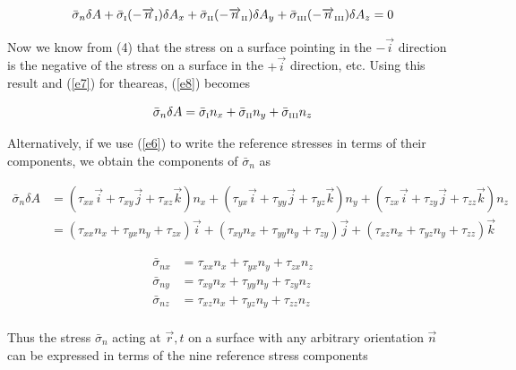 \documentclass{article}
\begin{document}
{\begin{equation}
\bar{\sigma}_{n}\delta A + \bar{\sigma}_{\text{\tiny{I}}}(-\overrightarrow{n}_{\text{\tiny{I}}})\delta A_{x} + \bar{\sigma}_{\text{\tiny{II}}}(-\overrightarrow{n}_{\text{\tiny{II}}})\delta A_{y} + \bar{\sigma}_{\text{\tiny{III}}}(-\overrightarrow{n}_{\text{\tiny{III}}})\delta A_{z} = 0 \label{e8}
\end{equation}

Now we know from (4) that the stress on a surface pointing in the $-\overrightarrow{i}$ direction is the negative of the stress on a surface in the $+\overrightarrow{i}$ direction, etc. Using this result and (\ref{e7}) for theareas, (\ref{e8}) becomes

\begin{equation}
\bar{\sigma}_{n}\delta A = \bar{\sigma}_{\text{\tiny{I}}}n_{x} + \bar{\sigma}_{\text{\tiny{II}}}n_{y} + \bar{\sigma}_{\text{\tiny{III}}}n_{z} \label{e9}
\end{equation}

Alternatively, if we use (\ref{e6}) to write the reference stresses in terms of their components, we obtain the components of $\bar{\sigma}_{n}$ as

\begin{align*}
\bar{\sigma}_{n}\delta A &= (\tau_{xx}\overrightarrow{i} + \tau_{xy}\overrightarrow{j} + \tau_{xz} \overrightarrow{k})n_{x} + (\tau_{yx}\overrightarrow{i} + \tau_{yy}\overrightarrow{j} + \tau_{yz} \overrightarrow{k})n_{y} + (\tau_{zx}\overrightarrow{i} + \tau_{zy}\overrightarrow{j} + \tau_{zz} \overrightarrow{k})n_{z}\\
						 &= (\tau_{xx}n_{x} + \tau_{yx}n_{y} + \tau_{zx})\overrightarrow{i} + (\tau_{xy}n_{x} + \tau_{yy}n_{y} + \tau_{zy})\overrightarrow{j} + (\tau_{xz}n_{x} + \tau_{yz}n_{y} + \tau_{zz})\overrightarrow{k}
\end{align*}

\begin{equation}
\begin{split}
\bar{\sigma}_{nx} &= \tau_{xx}n_{x} + \tau_{yx}n_{y} + \tau_{zx}n_{z}\\
\bar{\sigma}_{ny} &= \tau_{xy}n_{x} + \tau_{yy}n_{y} + \tau_{zy}n_{z}\\
\bar{\sigma}_{nz} &= \tau_{xz}n_{x} + \tau_{yz}n_{y} + \tau_{zz}n_{z}\\ \label{e10}
\end{split}
\end{equation}

Thus the stress $\bar{\sigma}_{n}$ acting at $\overrightarrow{r},t$ on a surface with any arbitrary orientation $\overrightarrow{n}$ can be expressed in terms of the nine reference stress components

}
\end{document}

